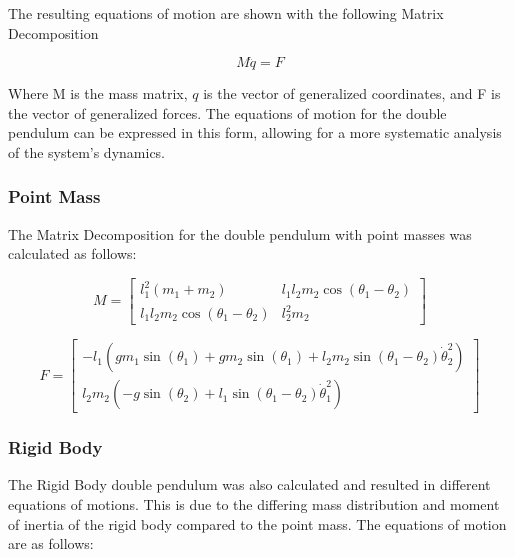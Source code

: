 \documentclass[onecolumn,draftcls]{IEEEtran}
\begin{document}
The resulting equations of motion are shown with the following Matrix Decomposition

\begin{equation}
    \label{eq:matrix_decomposition}
    M \ddot{q} = F
\end{equation}

Where M is the mass matrix, ${q}$ is the vector of generalized coordinates, and F is the vector of generalized forces. The equations of motion for the double pendulum can be expressed in this form, allowing for a more systematic analysis of the system's dynamics.

\subsubsection*{Point Mass} The Matrix Decomposition for the double pendulum with point masses was calculated as follows:

\begin{equation}
    \label{eq:double_pendulum_mass_matrix} M =
    \left[\begin{matrix}l_{1}^{2} \left(m_{1} + m_{2}\right)              & l_{1}
              l_{2} m_{2} \cos{\left(\theta_{1} - \theta_{2} \right)}       \\l_{1} l_{2}
              m_{2} \cos{\left(\theta_{1} - \theta_{2} \right)} & l_{2}^{2}
              m_{2}\end{matrix}\right]
\end{equation}

\begin{equation} \label{eq:double_pendulum_forcing_terms} F =
    \left[\begin{matrix}- l_{1} \left(g m_{1} \sin{\left(\theta_{1} \right)} + g m_{2} \sin{\left(\theta_{1} \right)} + l_{2} m_{2} \sin{\left(\theta_{1} - \theta_{2} \right)} \dot{\theta}_{2}^{2}\right)\\l_{2} m_{2} \left(- g \sin{\left(\theta_{2} \right)} + l_{1} \sin{\left(\theta_{1} - \theta_{2} \right)} \dot{\theta}_{1}^{2}\right)\end{matrix}\right]
\end{equation}


\subsubsection*{Rigid Body}
The Rigid Body double pendulum was also calculated and resulted in different equations of motions. This is due to the differing mass distribution and moment of inertia of the rigid body compared to the point mass. The equations of motion are as follows:
\end{document}
